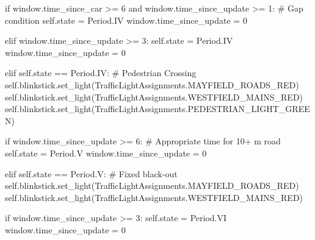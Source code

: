 \documentclass[
  letterpaper,
  DIV=11,
  numbers=noendperiod]{scrartcl}
\newenvironment{Shaded}{\begin{snugshade}}{\end{snugshade}}
\newcommand{\CommentTok}[1]{\textcolor[rgb]{0.37,0.37,0.37}{#1}}
\newcommand{\ControlFlowTok}[1]{\textcolor[rgb]{0.00,0.23,0.31}{#1}}
\newcommand{\DecValTok}[1]{\textcolor[rgb]{0.68,0.00,0.00}{#1}}
\newcommand{\KeywordTok}[1]{\textcolor[rgb]{0.00,0.23,0.31}{#1}}
\newcommand{\NormalTok}[1]{\textcolor[rgb]{0.00,0.23,0.31}{#1}}
\newcommand{\OperatorTok}[1]{\textcolor[rgb]{0.37,0.37,0.37}{#1}}
\newcommand{\VariableTok}[1]{\textcolor[rgb]{0.07,0.07,0.07}{#1}}
\begin{document}
\begin{Shaded}
\begin{Highlighting}[]
            \ControlFlowTok{if}\NormalTok{ window.time\_since\_car }\OperatorTok{\textgreater{}=} \DecValTok{6} \KeywordTok{and}\NormalTok{ window.time\_since\_update }\OperatorTok{\textgreater{}=} \DecValTok{1}\NormalTok{:}
                \CommentTok{\# Gap condition}
                \VariableTok{self}\NormalTok{.state }\OperatorTok{=}\NormalTok{ Period.IV}
\NormalTok{                window.time\_since\_update }\OperatorTok{=} \DecValTok{0}
            
            \ControlFlowTok{elif}\NormalTok{ window.time\_since\_update }\OperatorTok{\textgreater{}=} \DecValTok{3}\NormalTok{:}
                \VariableTok{self}\NormalTok{.state }\OperatorTok{=}\NormalTok{ Period.IV}
\NormalTok{                window.time\_since\_update }\OperatorTok{=} \DecValTok{0}

        \ControlFlowTok{elif} \VariableTok{self}\NormalTok{.state }\OperatorTok{==}\NormalTok{ Period.IV:}
            \CommentTok{\# Pedestrian Crossing}
            \VariableTok{self}\NormalTok{.blinkstick.set\_light(TrafficLightAssignments.MAYFIELD\_ROADS\_RED)}
            \VariableTok{self}\NormalTok{.blinkstick.set\_light(TrafficLightAssignments.WESTFIELD\_MAINS\_RED)}
            \VariableTok{self}\NormalTok{.blinkstick.set\_light(TrafficLightAssignments.PEDESTRIAN\_LIGHT\_GREEN)}
            
            \ControlFlowTok{if}\NormalTok{ window.time\_since\_update }\OperatorTok{\textgreater{}=} \DecValTok{6}\NormalTok{:}
                \CommentTok{\# Appropriate time for 10+ m road}
                \VariableTok{self}\NormalTok{.state }\OperatorTok{=}\NormalTok{ Period.V}
\NormalTok{                window.time\_since\_update }\OperatorTok{=} \DecValTok{0}
        
        \ControlFlowTok{elif} \VariableTok{self}\NormalTok{.state }\OperatorTok{==}\NormalTok{ Period.V:}
            \CommentTok{\# Fixed black{-}out}
            \VariableTok{self}\NormalTok{.blinkstick.set\_light(TrafficLightAssignments.MAYFIELD\_ROADS\_RED)}
            \VariableTok{self}\NormalTok{.blinkstick.set\_light(TrafficLightAssignments.WESTFIELD\_MAINS\_RED)}
            
            \ControlFlowTok{if}\NormalTok{ window.time\_since\_update }\OperatorTok{\textgreater{}=} \DecValTok{3}\NormalTok{:}
                \VariableTok{self}\NormalTok{.state }\OperatorTok{=}\NormalTok{ Period.VI}
\NormalTok{                window.time\_since\_update }\OperatorTok{=} \DecValTok{0}
        

\end{Highlighting}
\end{Shaded}
\end{document}
